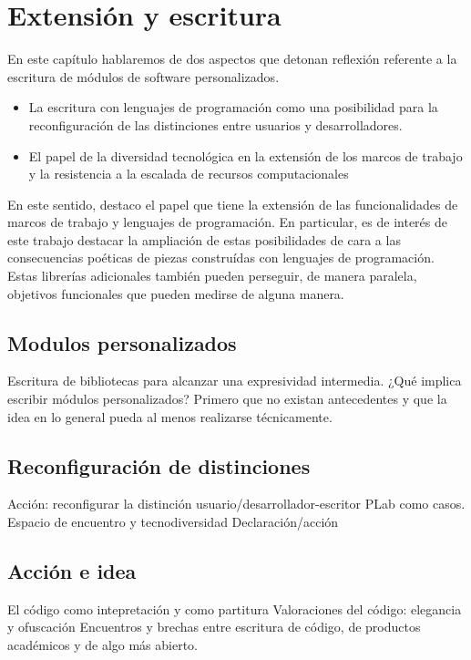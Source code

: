 \chapter{Extensión y escritura}

En este capítulo hablaremos de dos aspectos que detonan reflexión referente a la escritura de módulos de software personalizados.

\begin{itemize}
\item La escritura con lenguajes de programación como una posibilidad para la reconfiguración de las distinciones entre usuarios y desarrolladores.
\item El papel de la diversidad tecnológica en la extensión de los marcos de trabajo y la resistencia a la escalada de recursos computacionales
\end{itemize}

En este sentido, destaco el papel que tiene la extensión de las funcionalidades de marcos de trabajo y lenguajes de programación. En particular, es de interés de este trabajo destacar la ampliación de estas posibilidades de cara a las consecuencias poéticas de piezas construídas con lenguajes de programación. Estas librerías adicionales también pueden perseguir, de manera paralela, objetivos funcionales que pueden medirse de alguna manera. 

\section{Modulos personalizados}

Escritura de bibliotecas para alcanzar una expresividad intermedia.
¿Qué implica escribir módulos personalizados?
Primero que no existan antecedentes y que la idea en lo general pueda al menos realizarse técnicamente.

\section{Reconfiguración de distinciones}

Acción: reconfigurar la distinción usuario/desarrollador-escritor
PLab como casos. Espacio de encuentro y tecnodiversidad
Declaración/acción

\section{Acción e idea}

El código como intepretación y como partitura
Valoraciones del código: elegancia y ofuscación
Encuentros y brechas entre escritura de código, de productos académicos y de algo más abierto.
